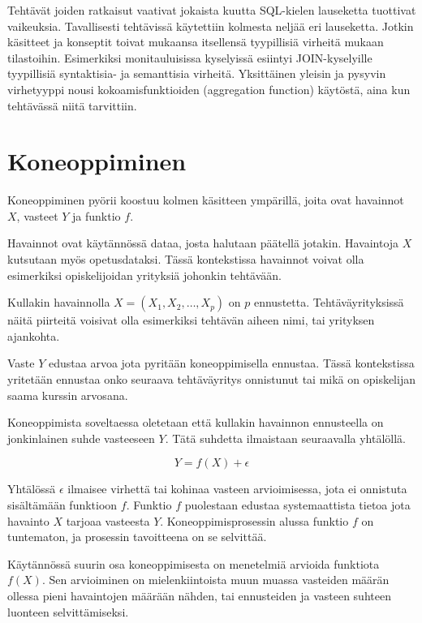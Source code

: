 \documentclass[finnish,twoside,openright]{HYgraduMLDS}
\begin{document}
Tehtävät joiden ratkaisut vaativat jokaista kuutta SQL-kielen lauseketta tuottivat vaikeuksia\cite{Taipalus:2019:EFS:3287324.3287359}. Tavallisesti tehtävissä käytettiin kolmesta neljää eri lauseketta. Jotkin käsitteet ja konseptit toivat mukaansa itsellensä tyypillisiä virheitä mukaan tilastoihin. Esimerkiksi monitauluisissa kyselyissä esiintyi JOIN-kyselyille tyypillisiä syntaktisia- ja semanttisia virheitä. Yksittäinen yleisin ja pysyvin virhetyyppi nousi kokoamisfunktioiden (aggregation function) käytöstä, aina kun tehtävässä niitä tarvittiin. 


\section{Koneoppiminen}

Koneoppiminen pyörii koostuu kolmen käsitteen ympärillä, joita ovat havainnot $X$, vasteet $Y$ ja funktio $f$.

Havainnot ovat käytännössä dataa, josta halutaan päätellä jotakin. Havaintoja $X$ kutsutaan myös opetusdataksi. Tässä kontekstissa havainnot voivat olla esimerkiksi opiskelijoidan yrityksiä johonkin tehtävään. 

Kullakin havainnolla $X = (X_1, X_2, \dots, X_p)$ on $p$ ennustetta. Tehtäväyrityksissä näitä piirteitä voisivat olla esimerkiksi tehtävän aiheen nimi, tai yrityksen ajankohta.

Vaste $Y$ edustaa arvoa jota pyritään koneoppimisella ennustaa. Tässä kontekstissa yritetään ennustaa onko seuraava tehtäväyritys onnistunut tai mikä on opiskelijan saama kurssin arvosana. 

Koneoppimista soveltaessa oletetaan että kullakin havainnon ennusteella on jonkinlainen suhde vasteeseen $Y$. Tätä suhdetta ilmaistaan seuraavalla yhtälöllä.

\begin{equation}
    Y = f(X) + \epsilon
\end{equation}

Yhtälössä $\epsilon$ ilmaisee virhettä tai kohinaa vasteen arvioimisessa, jota ei onnistuta sisältämään funktioon $f$. Funktio $f$ puolestaan edustaa systemaattista tietoa jota havainto $X$ tarjoaa vasteesta $Y$. Koneoppimisprosessin alussa funktio $f$ on tuntematon, ja prosessin tavoitteena on se selvittää.

Käytännössä suurin osa koneoppimisesta on menetelmiä arvioida funktiota $f(X)$. Sen arvioiminen on mielenkiintoista muun muassa vasteiden määrän ollessa pieni havaintojen määrään nähden, tai ennusteiden ja vasteen suhteen luonteen selvittämiseksi.
\end{document}
